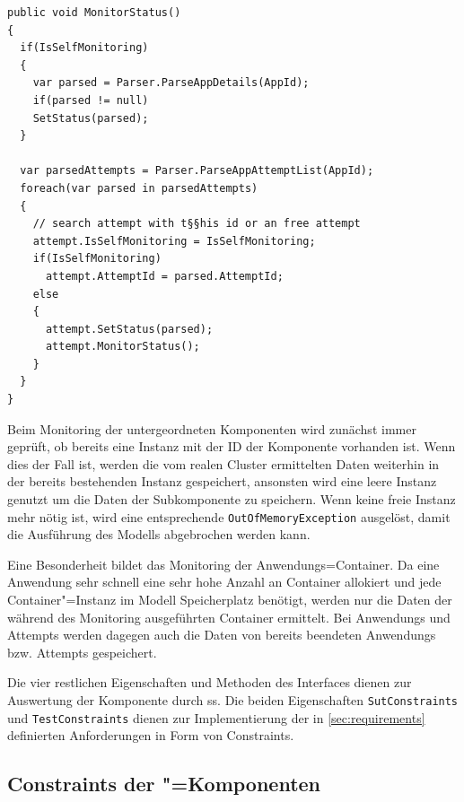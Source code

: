 \begin{lstlisting}[label=lst:monitorAppStatus,style=cs,
caption={[Implementierung der Methode MonitorStatus() in der Klasse YarnApp]
    Implementierung der Methode \texttt{MonitorStatus()} in der Klasse \texttt{YarnApp} (gekürzt).
    Das Monitoring der anderen Komponenten erfolgt analog hierzu.}]
public void MonitorStatus()
{
  if(IsSelfMonitoring)
  {
    var parsed = Parser.ParseAppDetails(AppId);
    if(parsed != null)
    SetStatus(parsed);
  }
  
  var parsedAttempts = Parser.ParseAppAttemptList(AppId);
  foreach(var parsed in parsedAttempts)
  {
    // search attempt with t§§his id or an free attempt
    attempt.IsSelfMonitoring = IsSelfMonitoring;
    if(IsSelfMonitoring)
      attempt.AttemptId = parsed.AttemptId;
    else
    {
      attempt.SetStatus(parsed);
      attempt.MonitorStatus();
    }
  }
}
\end{lstlisting}

Beim Monitoring der untergeordneten Komponenten wird zunächst immer geprüft, ob bereits eine Instanz mit der ID der Komponente vorhanden ist.
Wenn dies der Fall ist, werden die vom realen Cluster ermittelten Daten weiterhin in der bereits bestehenden Instanz gespeichert, ansonsten wird eine leere Instanz genutzt um die Daten der Subkomponente zu speichern.
Wenn keine freie Instanz mehr nötig ist, wird eine entsprechende \texttt{OutOfMemoryException} ausgelöst, damit die Ausführung des Modells abgebrochen werden kann.

Eine Besonderheit bildet das Monitoring der Anwendungs=Container.
Da eine \gls{Anwendung} sehr schnell eine sehr hohe Anzahl an \gls{Container} allokiert und jede Container"=Instanz im Modell Speicherplatz benötigt, werden nur die Daten der während des Monitoring ausgeführten \gls{Container} ermittelt.
Bei \glspl{Anwendung} und \glspl{Attempt} werden dagegen auch die Daten von bereits beendeten \glspl{Anwendung} bzw. \glspl{Attempt} gespeichert.

Die vier restlichen Eigenschaften und Methoden des Interfaces dienen zur Auswertung der Komponente durch \gls{ss}.
Die beiden Eigenschaften \texttt{SutConstraints} und \texttt{TestConstraints} dienen zur Implementierung der in \cref{sec:requirements} definierten Anforderungen in Form von Constraints.

\subsection{Constraints der "=Komponenten}
\label{subsec:yarnComponentConstraints}

